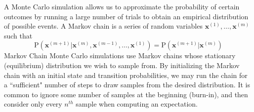 \documentclass[11pt, oneside]{article}     %
\newcommand{\pr}{\mathrm{P}}
\renewcommand{\vec}[1]{\mathbf{#1}}
\begin{document}
A Monte Carlo simulation allows us to approximate the probability of certain outcomes by running a large number of
trials to obtain an empirical distribution of possible events. A Markov chain is a series of random variables 
$\vec{x}^{(1)}, \ldots, \vec{x}^{(m)}$ such that
\begin{equation}
\pr(\vec{x}^{(m + 1)} | \vec{x}^{(m)}, \vec{x}^{(m-1)}, \ldots, \vec{x}^{(1)}) =\pr(\vec{x}^{(m + 1)} | \vec{x}^{(m)}) 
\end{equation}
Markov Chain Monte Carlo simulations use Markov chains whose stationary (equilibrium) distribution we wish to sample from. By initializing the Markov chain with an initial state and transition probabilities, we may run the chain for a ``sufficient" number of steps to draw samples from the desired distribution. It is common to ignore some number of samples at the beginning (burn-in), and then consider only every $n^{{th}}$ sample when computing an expectation.
\end{document}
